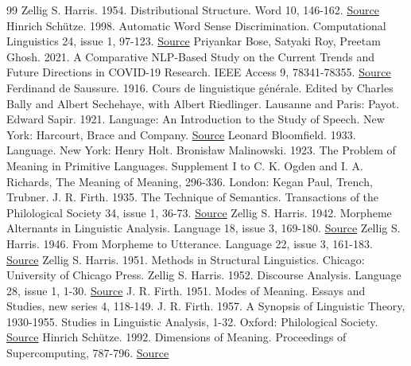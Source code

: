 \documentclass[10pt,letterpaper]{article}
\begin{document}
\begingroup\small
\begin{thebibliography}{99}
\setlength{\itemsep}{4pt}
Zellig S. Harris. 1954. Distributional Structure. Word 10, 146-162. \href{https://doi.org/10.1080/00437956.1954.11659520}{Source}
Hinrich Schütze. 1998. Automatic Word Sense Discrimination. Computational Linguistics 24, issue 1, 97-123. \href{https://aclanthology.org/J98-1004/}{Source}
Priyankar Bose, Satyaki Roy, Preetam Ghosh. 2021. A Comparative NLP-Based Study on the Current Trends and Future Directions in COVID-19 Research. IEEE Access 9, 78341-78355. \href{https://doi.org/10.1109/ACCESS.2021.3082108}{Source}
Ferdinand de Saussure. 1916. Cours de linguistique générale. Edited by Charles Bally and Albert Sechehaye, with Albert Riedlinger. Lausanne and Paris: Payot.
Edward Sapir. 1921. Language: An Introduction to the Study of Speech. New York: Harcourt, Brace and Company. \href{https://pure.mpg.de/pubman/item/item_2381135_2/component/file_2381134/Sapir_1921_language.pdf}{Source}
Leonard Bloomfield. 1933. Language. New York: Henry Holt.
Bronisław Malinowski. 1923. The Problem of Meaning in Primitive Languages. Supplement I to C. K. Ogden and I. A. Richards, The Meaning of Meaning, 296-336. London: Kegan Paul, Trench, Trubner.
J. R. Firth. 1935. The Technique of Semantics. Transactions of the Philological Society 34, issue 1, 36-73. \href{https://doi.org/10.1111/j.1467-968X.1935.tb01254.x}{Source}
Zellig S. Harris. 1942. Morpheme Alternants in Linguistic Analysis. Language 18, issue 3, 169-180. \href{https://doi.org/10.2307/409550}{Source}
Zellig S. Harris. 1946. From Morpheme to Utterance. Language 22, issue 3, 161-183. \href{https://doi.org/10.2307/410205}{Source}
Zellig S. Harris. 1951. Methods in Structural Linguistics. Chicago: University of Chicago Press.
Zellig S. Harris. 1952. Discourse Analysis. Language 28, issue 1, 1-30. \href{https://doi.org/10.2307/409987}{Source}
J. R. Firth. 1951. Modes of Meaning. Essays and Studies, new series 4, 118-149.
J. R. Firth. 1957. A Synopsis of Linguistic Theory, 1930-1955. Studies in Linguistic Analysis, 1-32. Oxford: Philological Society. \href{https://languagelog.ldc.upenn.edu/myl/Firth1957.pdf}{Source}
Hinrich Schütze. 1992. Dimensions of Meaning. Proceedings of Supercomputing, 787-796. \href{https://doi.org/10.1109/SUPERC.1992.236684}{Source}

\end{thebibliography}
\end{document}
